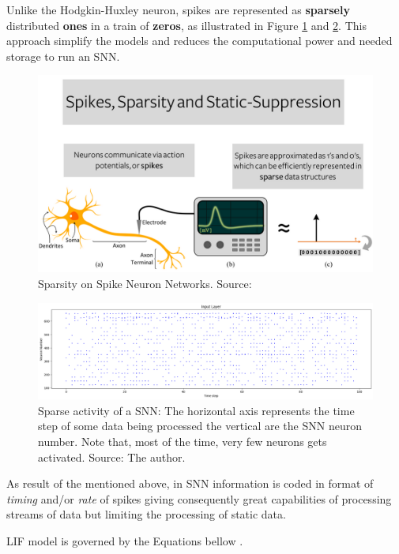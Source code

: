 			\par Unlike the Hodgkin-Huxley neuron, spikes are represented as \textbf{sparsely} distributed \textbf{ones} in a train of \textbf{zeros}, as illustrated in Figure \ref{fig:spikessparsitystaticsupress} and \ref{fig:sparsity}. This approach simplify the models and reduces the computational power and needed storage to run an SNN.
			
			\begin{figure}[H]
				\centering
				\includegraphics[width=0.6\linewidth]{images/spikesSparsityStaticSupress}
				\caption{Sparsity on Spike Neuron Networks. Source: \cite{10242251}}
				\label{fig:spikessparsitystaticsupress}
			\end{figure}
			
			\begin{figure}[H]
				\centering
				\includegraphics[width=.8\linewidth]{images/sparsity}
				\caption[Sparse activity of a SNN]{Sparse activity of a SNN: The horizontal axis represents the time step of some data being processed the vertical are the SNN neuron number. Note that, most of the time, very few neurons gets activated. Source: The author.}
				\label{fig:sparsity}
			\end{figure}
				
			\par As result of the mentioned above, in SNN information is coded in format of \textit{timing} and/or \textit{rate} of spikes giving consequently great capabilities of processing streams of data but limiting the processing of static data.\newline
			
			\par LIF model is governed by the Equations bellow \cite{10242251}.\newline
			
